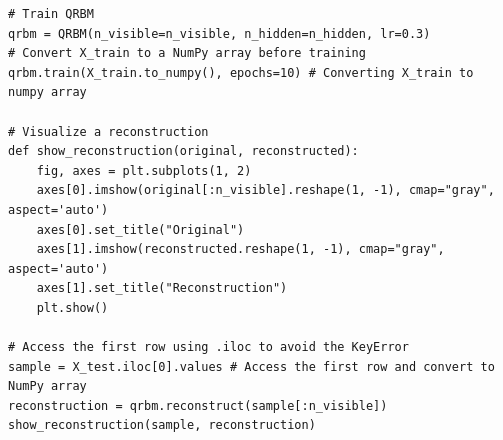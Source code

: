 \documentclass[%
oneside,                 %
final,                   %
10pt]{article}
\begin{document}
\begin{verbatim}
# Train QRBM
qrbm = QRBM(n_visible=n_visible, n_hidden=n_hidden, lr=0.3)
# Convert X_train to a NumPy array before training
qrbm.train(X_train.to_numpy(), epochs=10) # Converting X_train to numpy array

# Visualize a reconstruction
def show_reconstruction(original, reconstructed):
    fig, axes = plt.subplots(1, 2)
    axes[0].imshow(original[:n_visible].reshape(1, -1), cmap="gray", aspect='auto')
    axes[0].set_title("Original")
    axes[1].imshow(reconstructed.reshape(1, -1), cmap="gray", aspect='auto')
    axes[1].set_title("Reconstruction")
    plt.show()

# Access the first row using .iloc to avoid the KeyError
sample = X_test.iloc[0].values # Access the first row and convert to NumPy array
reconstruction = qrbm.reconstruct(sample[:n_visible])
show_reconstruction(sample, reconstruction)


\end{verbatim}


\end{document}
